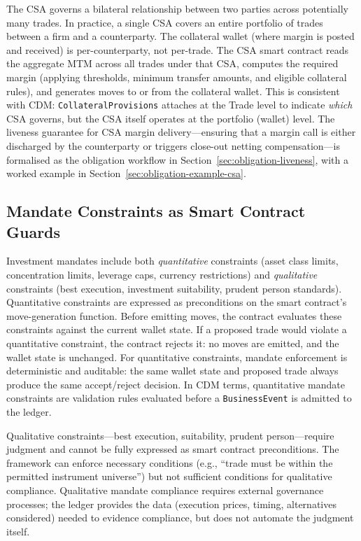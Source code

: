 \documentclass[11pt,a4paper]{article}
\begin{document}
The CSA governs a bilateral relationship between two parties across potentially many trades. In practice, a single CSA covers an entire portfolio of trades between a firm and a counterparty. The collateral wallet (where margin is posted and received) is per-counterparty, not per-trade. The CSA smart contract reads the aggregate MTM across all trades under that CSA, computes the required margin (applying thresholds, minimum transfer amounts, and eligible collateral rules), and generates moves to or from the collateral wallet. This is consistent with CDM: \texttt{CollateralProvisions} attaches at the Trade level to indicate \emph{which} CSA governs, but the CSA itself operates at the portfolio (wallet) level. The liveness guarantee for CSA margin delivery---ensuring that a margin call is either discharged by the counterparty or triggers close-out netting compensation---is formalised as the obligation workflow in Section~\ref{sec:obligation-liveness}, with a worked example in Section~\ref{sec:obligation-example-csa}.

\subsection{Mandate Constraints as Smart Contract Guards}

Investment mandates include both \emph{quantitative} constraints (asset class limits, concentration limits, leverage caps, currency restrictions) and \emph{qualitative} constraints (best execution, investment suitability, prudent person standards). Quantitative constraints are expressed as preconditions on the smart contract's move-generation function. Before emitting moves, the contract evaluates these constraints against the current wallet state. If a proposed trade would violate a quantitative constraint, the contract rejects it: no moves are emitted, and the wallet state is unchanged. For quantitative constraints, mandate enforcement is deterministic and auditable: the same wallet state and proposed trade always produce the same accept/reject decision. In CDM terms, quantitative mandate constraints are validation rules evaluated before a \texttt{BusinessEvent} is admitted to the ledger.

Qualitative constraints---best execution, suitability, prudent person---require judgment and cannot be fully expressed as smart contract preconditions. The framework can enforce necessary conditions (e.g., ``trade must be within the permitted instrument universe'') but not sufficient conditions for qualitative compliance. Qualitative mandate compliance requires external governance processes; the ledger provides the data (execution prices, timing, alternatives considered) needed to evidence compliance, but does not automate the judgment itself.
\end{document}
